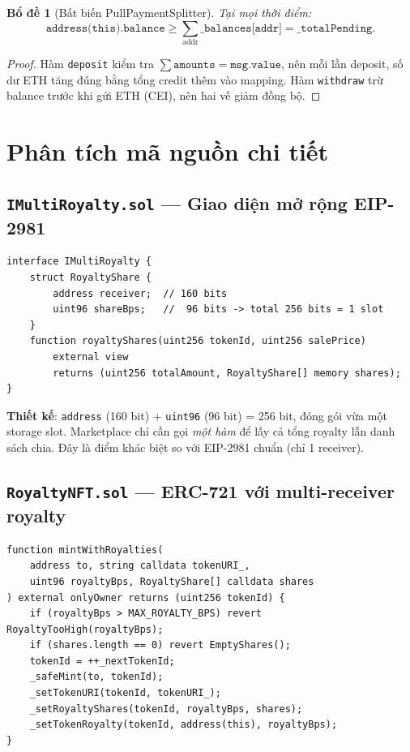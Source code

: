 \documentclass[12pt,a4paper,oneside]{report}
\theoremstyle{plain}
\newtheorem{lemma}[theorem]{Bổ đề}
\theoremstyle{definition}
\theoremstyle{remark}
\begin{document}
\begin{lemma}[Bất biến PullPaymentSplitter]\label{lem:splitter-inv}
Tại mọi thời điểm:
\[
  \texttt{address(this).balance} \ge \sum_{\text{addr}} \texttt{\_balances[addr]} = \texttt{\_totalPending}.
\]
\end{lemma}
\begin{proof}
Hàm \texttt{deposit} kiểm tra $\sum \texttt{amounts} = \texttt{msg.value}$, nên mỗi lần deposit,
số dư ETH tăng đúng bằng tổng credit thêm vào mapping. Hàm \texttt{withdraw} trừ balance trước
khi gửi ETH (CEI), nên hai vế giảm đồng bộ.
\end{proof}

\chapter{Phân tích mã nguồn chi tiết}
\label{chap:code}

\section{\texttt{IMultiRoyalty.sol} — Giao diện mở rộng EIP-2981}

\begin{lstlisting}[language=Solidity,caption={Giao diện IMultiRoyalty.}]
interface IMultiRoyalty {
    struct RoyaltyShare {
        address receiver;  // 160 bits
        uint96 shareBps;   //  96 bits -> total 256 bits = 1 slot
    }
    function royaltyShares(uint256 tokenId, uint256 salePrice)
        external view
        returns (uint256 totalAmount, RoyaltyShare[] memory shares);
}
\end{lstlisting}

\textbf{Thiết kế}: \texttt{address} (160 bit) + \texttt{uint96} (96 bit) = 256 bit, đóng gói vừa
một storage slot. Marketplace chỉ cần gọi \emph{một hàm} để lấy cả tổng royalty lẫn danh sách chia.
Đây là điểm khác biệt so với EIP-2981 chuẩn (chỉ 1 receiver).

\section{\texttt{RoyaltyNFT.sol} — ERC-721 với multi-receiver royalty}

\begin{lstlisting}[language=Solidity,caption={Hàm \texttt{mintWithRoyalties} — mint kèm cấu hình royalty.}]
function mintWithRoyalties(
    address to, string calldata tokenURI_,
    uint96 royaltyBps, RoyaltyShare[] calldata shares
) external onlyOwner returns (uint256 tokenId) {
    if (royaltyBps > MAX_ROYALTY_BPS) revert RoyaltyTooHigh(royaltyBps);
    if (shares.length == 0) revert EmptyShares();
    tokenId = ++_nextTokenId;
    _safeMint(to, tokenId);
    _setTokenURI(tokenId, tokenURI_);
    _setRoyaltyShares(tokenId, royaltyBps, shares);
    _setTokenRoyalty(tokenId, address(this), royaltyBps);
}
\end{lstlisting}
\end{document}
